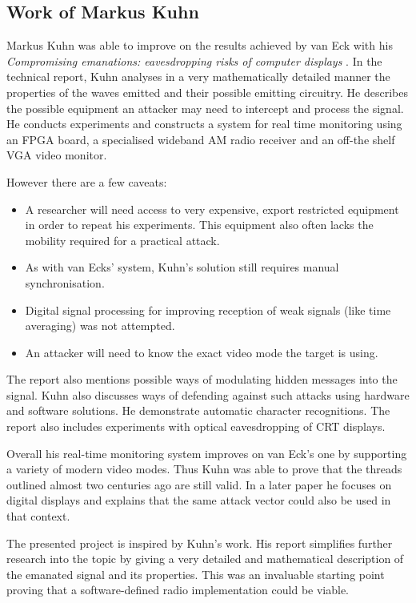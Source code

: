 \documentclass[a4paper,12pt,twoside,openright]{report}
\begin{document}
\subsection{Work of Markus Kuhn}

Markus Kuhn was able to improve on the results achieved by van Eck with his \textit{Compromising emanations: eavesdropping risks of computer displays} \cite{kuhn2003compromising}. In the technical report, Kuhn analyses in a very mathematically detailed manner the properties of the waves emitted and their possible emitting circuitry. He describes the possible equipment an attacker may need to intercept and process the signal. He conducts experiments and constructs a system for real time monitoring using an FPGA board, a specialised wideband AM radio receiver and an off-the shelf VGA video monitor. 

However there are a few caveats:

\begin{itemize}

  \item A researcher will need access to very expensive, export restricted equipment in order to repeat his experiments. This equipment also often lacks the mobility required for a practical attack.
  \item As with van Ecks' system, Kuhn's solution still requires manual synchronisation.
  \item Digital signal processing for improving reception of weak signals (like time averaging) was not attempted.
  \item An attacker will need to know the exact video mode the target is using.

\end{itemize}

The report also mentions possible ways of modulating hidden messages into the signal. Kuhn also discusses ways of defending against such attacks using hardware and software solutions. He demonstrate automatic character recognitions. The report also includes experiments with optical eavesdropping of CRT displays.

Overall his real-time monitoring system improves on van Eck's one by supporting a variety of modern video modes. Thus Kuhn was able to prove that the threads outlined almost two centuries ago are still valid. In a later paper \cite{kuhn2005electromagnetic} he focuses on digital displays and explains that the same attack vector could also be used in that context.

The presented project is inspired by Kuhn's work. His report simplifies further research into the topic by giving a very detailed and mathematical description of the emanated signal and its properties. This was an invaluable starting point proving that a software-defined radio implementation could be viable.
\end{document}
